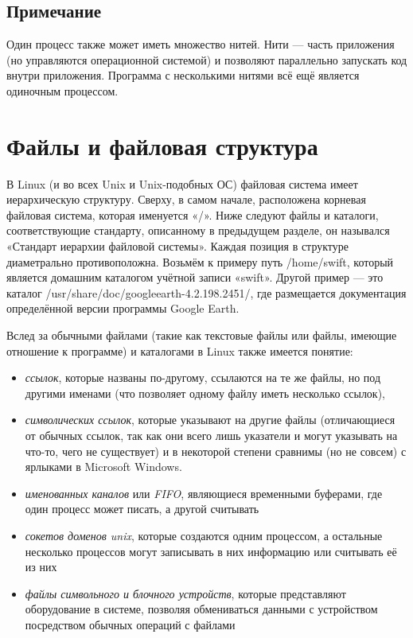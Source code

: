 \documentclass[12pt]{book}
\begin{document}
\subsection{Примечание}

Один процесс также может иметь множество нитей. Нити — часть приложения (но управляются операционной системой) и позволяют параллельно запускать код внутри приложения. Программа с несколькими нитями всё ещё является одиночным процессом.

\section{Файлы и файловая структура}

В Linux (и во всех Unix и Unix-подобных ОС) файловая система имеет иерархическую структуру. Сверху,  в самом начале, расположена корневая файловая система, которая именуется «/». Ниже следуют файлы и каталоги, соответствующие стандарту, описанному в предыдущем разделе, он назывался «Стандарт иерархии файловой системы». Каждая позиция в структуре диаметрально противоположна. Возьмём к примеру путь /home/swift,  который является домашним каталогом учётной записи «swift». Другой пример — это каталог /usr/share/doc/googleearth-4.2.198.2451/, где размещается документация определённой версии программы\break{} Google Earth.

Вслед за обычными файлами (такие как текстовые файлы или файлы, имеющие отношение к программе) и каталогами в Linux также имеется понятие:

\begin{itemize}
	\item \emph{ссылок}, которые названы по-другому, ссылаются на те же файлы, но под другими именами (что позволяет одному файлу иметь несколько ссылок),
	\item \emph{символических ссылок}, которые указывают на другие файлы (отличающиеся от обычных ссылок, так как они всего лишь указатели и могут указывать на что-то, чего не существует) и в некоторой степени сравнимы (но не совсем) с ярлыками в Microsoft Windows.
	\item \emph{именованных каналов} или \emph{FIFO}, являющиеся временными буферами, где один процесс может писать, а другой считывать
	\item \emph{сокетов доменов unix}, которые создаются  одним процессом, а остальные нес\-колько процессов могут записывать в них информацию или считывать её из них
	\item \emph{файлы символьного и блочного устройств}, которые представляют оборудование в системе, позволяя обмениваться данными с устройством посредством обычных операций с файлами
\end{itemize}
\end{document}
